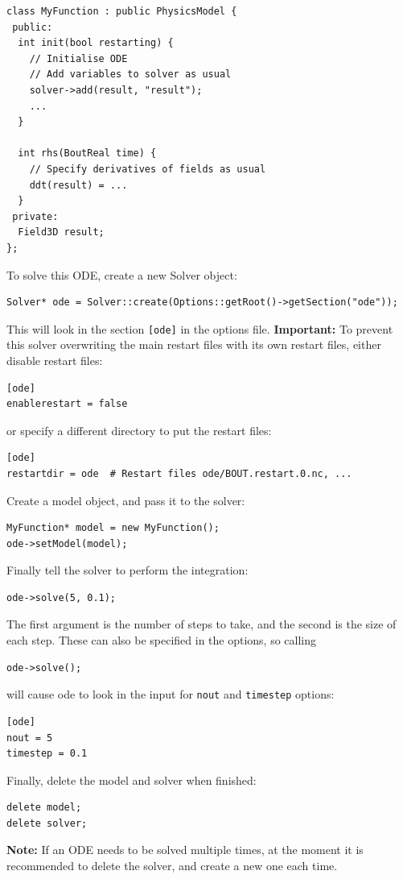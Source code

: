 \documentclass[12pt]{article}
\begin{document}
%
\begin{lstlisting}
class MyFunction : public PhysicsModel {
 public:
  int init(bool restarting) {
    // Initialise ODE
    // Add variables to solver as usual
    solver->add(result, "result");
    ...
  }

  int rhs(BoutReal time) {
    // Specify derivatives of fields as usual
    ddt(result) = ...
  }
 private:
  Field3D result;
};
\end{lstlisting}
%
To solve this ODE, create a new Solver object:
%
\begin{lstlisting}[numbers=none]
Solver* ode = Solver::create(Options::getRoot()->getSection("ode"));
\end{lstlisting}
%
This will look in the section \texttt{[ode]} in the options file.  {\bf
Important:} To prevent this solver overwriting the main restart files with its
own restart files, either disable restart files:
%
\begin{lstlisting}[numbers=none]
[ode]
enablerestart = false
\end{lstlisting}
%
or specify a different directory to put the restart files:
%
\begin{lstlisting}[numbers=none]
[ode]
restartdir = ode  # Restart files ode/BOUT.restart.0.nc, ...
\end{lstlisting}
%
Create a model object, and pass it to the solver:
%
\begin{lstlisting}[numbers=none]
MyFunction* model = new MyFunction();
ode->setModel(model);
\end{lstlisting}
%
Finally tell the solver to perform the integration:
%
\begin{lstlisting}[numbers=none]
ode->solve(5, 0.1);
\end{lstlisting}
%
The first argument is the number of steps to take, and the second is the size
of each step. These can also be specified in the options, so calling
%
\begin{lstlisting}[numbers=none]
ode->solve();
\end{lstlisting}
%
will cause ode to look in the input for \texttt{nout} and \texttt{timestep}
options:
%
\begin{lstlisting}[numbers=none]
[ode]
nout = 5
timestep = 0.1
\end{lstlisting}
%
Finally, delete the model and solver when finished:
%
\begin{lstlisting}[numbers=none]
delete model;
delete solver;
\end{lstlisting}
%
{\bf Note: } If an ODE needs to be solved multiple times, at the moment it is
recommended to delete the solver, and create a new one each time.
\end{document}
